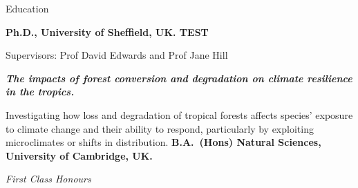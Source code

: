 \begin{rubric}{Education}

\entry*[2014 -- 2018]%
	\textbf{Ph.D., University of Sheffield, UK. TEST}
	\par Supervisors: Prof David Edwards and Prof Jane Hill
	\par \textbf{\emph{The impacts of forest conversion and degradation on climate resilience in the tropics.}}
	\par Investigating how loss and degradation of tropical forests affects species' exposure to climate change and their ability to respond, particularly by exploiting microclimates or shifts in distribution.
%
\entry*[2010 -- 2013]%
	\textbf{B.A.~(Hons) Natural Sciences, University of Cambridge, UK.}\par
	\emph{First Class Honours}
%
\end{rubric}